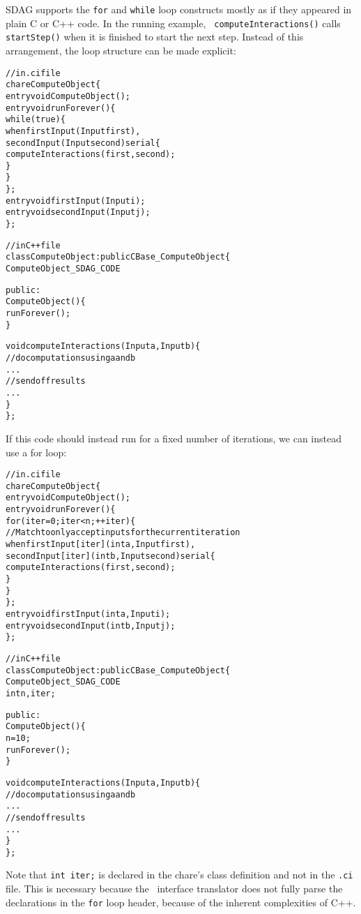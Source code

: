 SDAG supports the {\tt for} and {\tt while} loop constructs mostly as if they
appeared in plain C or C++ code. In the running example, {\tt
  computeInteractions()} calls {\tt startStep()} when it is finished to start
the next step. Instead of this arrangement, the loop structure can be made
explicit:
\begin{center}
\begin{alltt}
// in .ci file
chare ComputeObject \{
  entry void ComputeObject();
  entry void runForever() \{
    while(true) \{
      when firstInput(Input first),
           secondInput(Input second) serial \{
          computeInteractions(first, second);
      \}
    \}
  \};
  entry void firstInput(Input i);
  entry void secondInput(Input j);
\};

// in C++ file
class ComputeObject : public CBase_ComputeObject \{
  ComputeObject_SDAG_CODE

public:
  ComputeObject() \{
    runForever();
  \}

  void computeInteractions(Input a, Input b) \{
    // do computations using a and b
    . . .
    // send off results
    . . .
  \}
\};
\end{alltt}
\end{center}
If this code should instead run for a fixed number of iterations, we can
instead use a for loop:
\begin{center}
\begin{alltt}
// in .ci file
chare ComputeObject \{
  entry void ComputeObject();
  entry void runForever() \{
    for(iter = 0; iter < n; ++iter) \{
      // Match to only accept inputs for the current iteration
      when firstInput[iter](int a, Input first),
           secondInput[iter](int b, Input second) serial \{
        computeInteractions(first, second);
      \}
    \}
  \};
  entry void firstInput(int a, Input i);
  entry void secondInput(int b, Input j);
\};

// in C++ file
class ComputeObject : public CBase_ComputeObject \{
  ComputeObject_SDAG_CODE
  int n, iter;

public:
  ComputeObject() \{
    n = 10;
    runForever();
  \}

  void computeInteractions(Input a, Input b) \{
    // do computations using a and b
    . . .
    // send off results
    . . .
  \}
\};
\end{alltt}
\end{center}
Note that {\tt int iter;} is declared in the chare's class definition and not
in the {\tt .ci} file. This is necessary because the \charmpp\ interface
translator does not fully parse the declarations in the {\tt for} loop header,
because of the inherent complexities of C++.

